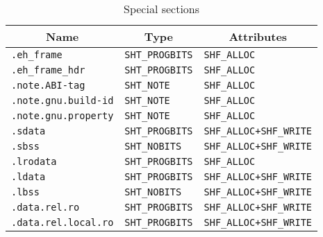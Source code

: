 \begin{table}[H]
\Hrule
  \caption{Special sections}
  \begin{center}
    \begin{tabular}[t]{l|l|l}
      \multicolumn{1}{c}{Name} & \multicolumn{1}{c}{Type}
       & \multicolumn{1}{c}{Attributes} \\
      \hline
      \texttt{.eh_frame} & \texttt{SHT_PROGBITS} & \texttt{SHF_ALLOC} \\
      \texttt{.eh_frame_hdr} & \texttt{SHT_PROGBITS} & \texttt{SHF_ALLOC} \\
      \texttt{.note.ABI-tag} & \texttt{SHT_NOTE} & \texttt{SHF_ALLOC} \\
      \texttt{.note.gnu.build-id} & \texttt{SHT_NOTE} & \texttt{SHF_ALLOC} \\
      \texttt{.note.gnu.property} & \texttt{SHT_NOTE} & \texttt{SHF_ALLOC} \\
      \texttt{.sdata} & \texttt{SHT_PROGBITS} & \texttt{SHF_ALLOC+SHF_WRITE} \\
      \texttt{.sbss} & \texttt{SHT_NOBITS} & \texttt{SHF_ALLOC+SHF_WRITE} \\
      \texttt{.lrodata} & \texttt{SHT_PROGBITS} & \texttt{SHF_ALLOC} \\
      \texttt{.ldata} & \texttt{SHT_PROGBITS} & \texttt{SHF_ALLOC+SHF_WRITE} \\
      \texttt{.lbss} & \texttt{SHT_NOBITS} & \texttt{SHF_ALLOC+SHF_WRITE} \\
      \texttt{.data.rel.ro} & \texttt{SHT_PROGBITS} & \texttt{SHF_ALLOC+SHF_WRITE} \\
      \texttt{.data.rel.local.ro} & \texttt{SHT_PROGBITS} & \texttt{SHF_ALLOC+SHF_WRITE}
    \end{tabular}
  \end{center}
\Hrule
\end{table}

